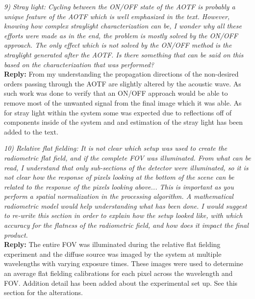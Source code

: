 \documentclass[12pt, notitlepage]{article}
\begin{document}
\hrulefill

\textit{9) Stray light: Cycling between the ON/OFF state of the AOTF is probably a unique
feature of the AOTF which is well emphasized in the text. However, knowing how
complex straylight characterization can be, I wonder why all these efforts were made
as in the end, the problem is mostly solved by the ON/OFF approach. The only effect
which is not solved by the ON/OFF method is the straylight generated after the AOTF.
Is there something that can be said on this based on the characterization that was
performed?}\\

\textbf{Reply:} From my understanding the propagation directions of the non-desired orders passing through the AOTF are slightly altered by the acoustic wave. As such work was done to verify that an ON/OFF approach would be able to remove most of the unwanted signal from the final image which it was able. As for stray light within the system some was expected due to reflections off of components inside of the system and and estimation of the stray light has been added to the text.

\hrulefill

\textit{10) Relative flat fielding: It is not clear which setup was used to create the radiometric
flat field, and if the complete FOV was illuminated. From what can be read, I understand
that only sub-sections of the detector were illuminated, so it is not clear how the
response of pixels looking at the bottom of the scene can be related to the response of
the pixels looking above... This is important as you perform a spatial normalization in
the processing algorithm. A mathematical radiometric model would help understanding
what has been done. I would suggest to re-write this section in order to explain how
the setup looked like, with which accuracy for the flatness of the radiometric field, and
how does it impact the final product.}\\

\textbf{Reply:} The entire FOV was illuminated during the relative flat fielding experiment and the diffuse source was imaged by the system at multiple wavelengths with varying exposure times. These images were used to determine an average flat fielding calibrations for each pixel across the wavelength and FOV. Addition detail has been added about the experimental set up. See this section for the alterations.

\hrulefill
\end{document}
